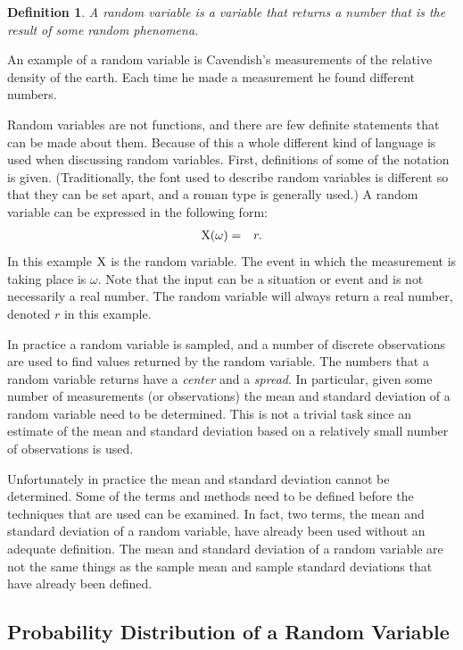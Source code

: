 \documentclass[12pt]{article}
\newtheorem{definition}{Definition}[section]
\begin{document}
\begin{definition}
  A random variable is a variable that returns a number that is the
  result of some random phenomena.
\end{definition}

An example of a random variable is Cavendish's measurements of the
relative density of the earth. Each time he made a measurement he
found different numbers.

Random variables are not functions, and there are few definite
statements that can be made about them. Because of this a whole
different kind of language is used when discussing random variables.
First, definitions of some of the notation is given.  (Traditionally,
the font used to describe random variables is different so that they
can be set apart, and a roman type is generally used.) A random
variable can be expressed in the following form:
\begin{eqnarray*}
  {\rm X}(\omega) & = & r.
\end{eqnarray*}
In this example ${\rm X}$ is the random variable. The event in which
the measurement is taking place is $\omega$. Note that the input can
be a situation or event and is not necessarily a real number. The
random variable will always return a real number, denoted $r$ in this
example.

In practice a random variable is sampled, and a number of discrete
observations are used to find values returned by the random variable.
The numbers that a random variable returns have a \textit{center} and
a \textit{spread}. In particular, given some number of measurements
(or observations) the mean and standard deviation of a random variable
need to be determined.  This is not a trivial task since an estimate
of the mean and standard deviation based on a relatively small number
of observations is used.

Unfortunately in practice the mean and standard deviation cannot be
determined. Some of the terms and methods need to be defined before the
techniques that are used can be examined. In fact, two terms, the mean
and standard deviation of a random variable, have already been used
without an adequate definition.  The mean and standard deviation of a
random variable are not the same things as the sample mean and sample
standard deviations that have already been defined.

\subsection{Probability Distribution of a Random Variable}
\end{document}

